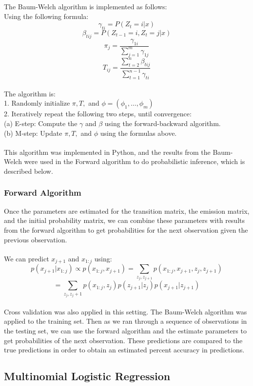 \documentclass{article}
\begin{document}
The Baum-Welch algorithm is implemented as follows:
\\ 
Using the following formula: \\
$$\gamma_{ti} = P(Z_t = i|x) $$
$$\beta_{tij} = P(Z_{t-1} = i, Z_t = j |x) $$
$$\pi_j = \dfrac{\gamma_{1i}}{\sum_{j=1}^m \gamma_{1j}}$$
$$T_{ij} = \dfrac{\sum_{t=2}^n \beta_{tij}}{ \sum_{t=1}^{n-1} \gamma_{ti}}$$ 
\\ 
The algorithm is: \\ 
1. Randomly initialize $\pi, T, $ and $\phi = (\phi_1,\hdots, \phi_m)$\\ 
2. Iteratively repeat the following two steps, until convergence: \\ 
(a) E-step: Compute the $\gamma$ and $\beta$ using the forward-backward algorithm.\\ 
(b) M-step: Update $\pi, T,$ and $\phi$ using the formulas above.\\
\\ 
This algorithm was implemented in Python, and the results from the Baum-Welch were used in the Forward algorithm to do probabilistic inference, which is described below. 

\subsubsection{Forward Algorithm}

Once the parameters are estimated for the transition matrix, the emission matrix, and the initial probability matrix, we can combine these parameters with results from the forward algorithm to get probabilities for the next observation given the previous observation.  \\ 
\\ 
We can predict $x_{j+1}$ and $x_{1:j}$ using: \\ 
$$p(x_{j+1}|x_{1:j}) \propto p(x_{1:j}, x_{j+1}) = \sum_{z_j, z_{j+1}} p(x_{1:j}, x_{j+1}, z_j, z_{j+1})$$
$$ = \sum_{z_j, z_j+1} p(x_{1:j}, z_j) p(z_{j+1}|z_j) p(x_{j+1}|z_{j+1})$$
\\ 
Cross validation was also applied in this setting. The Baum-Welch algorithm was applied to the training set. Then as we ran through a sequence of observations in the testing set, we can use the forward algorithm and the estimate parameters to get probabilities of the next observation. These predictions are compared to the true predictions in order to obtain an estimated percent accuracy in predictions.

\subsection{Multinomial Logistic Regression}
\end{document}
